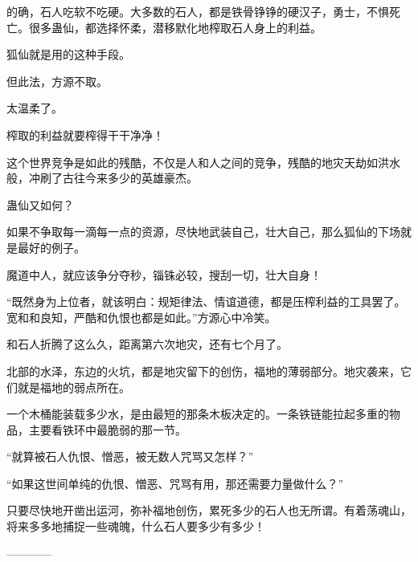 \begin{this_body}
的确，石人吃软不吃硬。大多数的石人，都是铁骨铮铮的硬汉子，勇士，不惧死亡。很多蛊仙，都选择怀柔，潜移默化地榨取石人身上的利益。

狐仙就是用的这种手段。

但此法，方源不取。

太温柔了。

榨取的利益就要榨得干干净净！

这个世界竞争是如此的残酷，不仅是人和人之间的竞争，残酷的地灾天劫如洪水般，冲刷了古往今来多少的英雄豪杰。

蛊仙又如何？

如果不争取每一滴每一点的资源，尽快地武装自己，壮大自己，那么狐仙的下场就是最好的例子。

魔道中人，就应该争分夺秒，锱铢必较，搜刮一切，壮大自身！

“既然身为上位者，就该明白：规矩律法、情谊道德，都是压榨利益的工具罢了。宽和和良知，严酷和仇恨也都是如此。”方源心中冷笑。

和石人折腾了这么久，距离第六次地灾，还有七个月了。

北部的水泽，东边的火坑，都是地灾留下的创伤，福地的薄弱部分。地灾袭来，它们就是福地的弱点所在。

一个木桶能装载多少水，是由最短的那条木板决定的。一条铁链能拉起多重的物品，主要看铁环中最脆弱的那一节。

“就算被石人仇恨、憎恶，被无数人咒骂又怎样？”

“如果这世间单纯的仇恨、憎恶、咒骂有用，那还需要力量做什么？”

只要尽快地开凿出运河，弥补福地创伤，累死多少的石人也无所谓。有着荡魂山，将来多多地捕捉一些魂魄，什么石人要多少有多少！

------------

\end{this_body}

